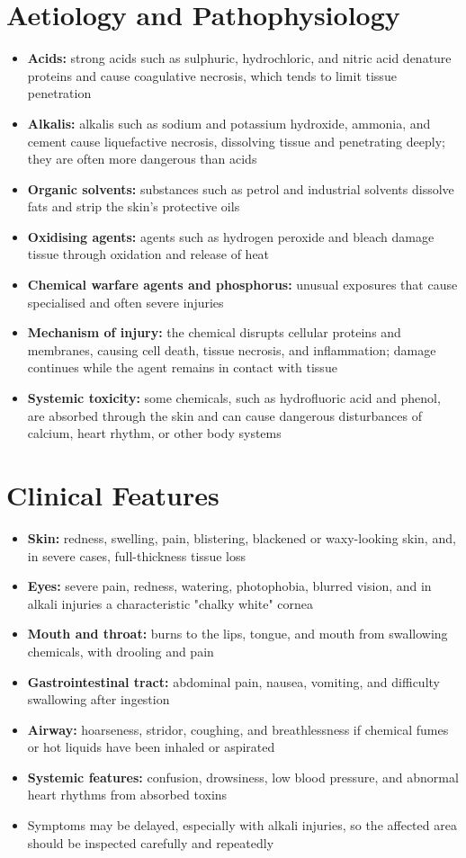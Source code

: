 \section*{Aetiology and Pathophysiology}
\begin{itemize}
    \item \textbf{Acids:} strong acids such as sulphuric, hydrochloric, and nitric acid denature proteins and cause coagulative necrosis, which tends to limit tissue penetration
    \item \textbf{Alkalis:} alkalis such as sodium and potassium hydroxide, ammonia, and cement cause liquefactive necrosis, dissolving tissue and penetrating deeply; they are often more dangerous than acids
    \item \textbf{Organic solvents:} substances such as petrol and industrial solvents dissolve fats and strip the skin's protective oils
    \item \textbf{Oxidising agents:} agents such as hydrogen peroxide and bleach damage tissue through oxidation and release of heat
    \item \textbf{Chemical warfare agents and phosphorus:} unusual exposures that cause specialised and often severe injuries
    \item \textbf{Mechanism of injury:} the chemical disrupts cellular proteins and membranes, causing cell death, tissue necrosis, and inflammation; damage continues while the agent remains in contact with tissue
    \item \textbf{Systemic toxicity:} some chemicals, such as hydrofluoric acid and phenol, are absorbed through the skin and can cause dangerous disturbances of calcium, heart rhythm, or other body systems
\end{itemize}

\section*{Clinical Features}
\begin{itemize}
    \item \textbf{Skin:} redness, swelling, pain, blistering, blackened or waxy-looking skin, and, in severe cases, full-thickness tissue loss
    \item \textbf{Eyes:} severe pain, redness, watering, photophobia, blurred vision, and in alkali injuries a characteristic "chalky white" cornea
    \item \textbf{Mouth and throat:} burns to the lips, tongue, and mouth from swallowing chemicals, with drooling and pain
    \item \textbf{Gastrointestinal tract:} abdominal pain, nausea, vomiting, and difficulty swallowing after ingestion
    \item \textbf{Airway:} hoarseness, stridor, coughing, and breathlessness if chemical fumes or hot liquids have been inhaled or aspirated
    \item \textbf{Systemic features:} confusion, drowsiness, low blood pressure, and abnormal heart rhythms from absorbed toxins
    \item Symptoms may be delayed, especially with alkali injuries, so the affected area should be inspected carefully and repeatedly
\end{itemize}


